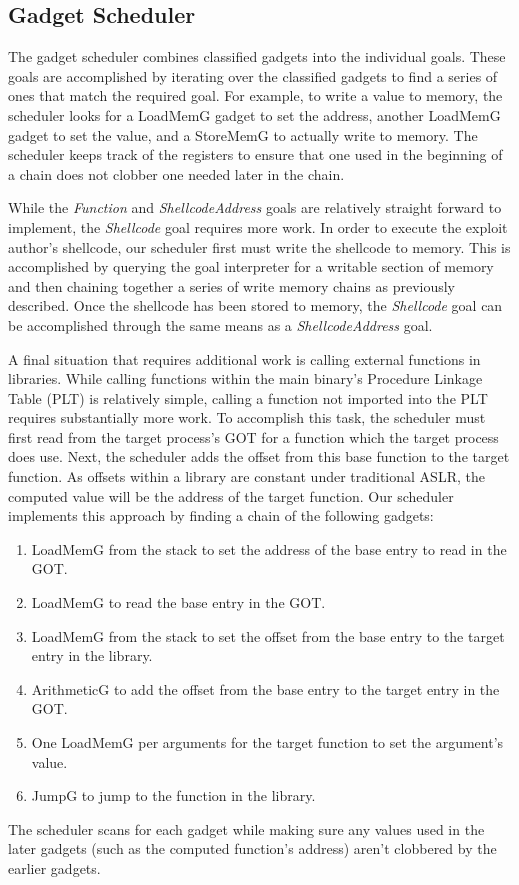 \documentclass[journal]{IEEEtran}
\begin{document}
\subsection{Gadget Scheduler}\label{scheduler}
The gadget scheduler combines classified gadgets into the individual goals.
These goals are accomplished by iterating over the classified gadgets to find a series of ones that match the required goal. 
For example, to write a value to memory, the scheduler looks for a LoadMemG gadget to set the address, another LoadMemG gadget to set the value, and a StoreMemG to actually write to memory.
The scheduler keeps track of the registers to ensure that one used in the beginning of a chain does not clobber one needed later in the chain.

While the \emph{Function} and \emph{ShellcodeAddress} goals are relatively straight forward to implement, the \emph{Shellcode} goal requires more work. 
In order to execute the exploit author's shellcode, our scheduler first must write the shellcode to memory.
This is accomplished by querying the goal interpreter for a writable section of memory and then chaining together a series of write memory chains as previously described.
Once the shellcode has been stored to memory, the \emph{Shellcode} goal can be accomplished through the same means as a \emph{ShellcodeAddress} goal.

A final situation that requires additional work is calling external functions in libraries.
While calling functions within the main binary's Procedure Linkage Table (PLT) is relatively simple, calling a function not imported into the PLT requires substantially more work.
To accomplish this task, the scheduler must first read from the target process's GOT for a function which the target process does use.
Next, the scheduler adds the offset from this base function to the target function.
As offsets within a library are constant under traditional ASLR, the computed value will be the address of the target function.
Our scheduler implements this approach by finding a chain of the following gadgets:
\begin{enumerate}
  \item LoadMemG from the stack to set the address of the base entry to read in the GOT.
  \item LoadMemG to read the base entry in the GOT.
  \item LoadMemG from the stack to set the offset from the base entry to the target entry in the library.
  \item ArithmeticG to add the offset from the base entry to the target entry in the GOT.
  \item One LoadMemG per arguments for the target function to set the argument's value.
  \item JumpG to jump to the function in the library.
\end{enumerate}
The scheduler scans for each gadget while making sure any values used in the later gadgets (such as the computed function's address) aren't clobbered by the earlier gadgets.
\end{document}
